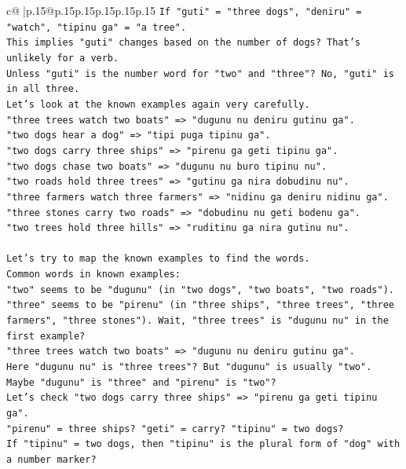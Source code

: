 \documentclass{article}
\begin{document}
{\begin{supertabular}{c@{$\;$}|p{.15\linewidth}@{}p{.15\linewidth}p{.15\linewidth}p{.15\linewidth}p{.15\linewidth}p{.15\linewidth}}
{{{\texttt{If "guti" = "three dogs", "deniru" = "watch", "tipinu ga" = "a tree".} \\
\texttt{This implies "guti" changes based on the number of dogs? That's unlikely for a verb.} \\
\texttt{Unless "guti" is the number word for "two" and "three"? No, "guti" is in all three.} \\
\texttt{Let's look at the known examples again very carefully.} \\
\texttt{"three trees watch two boats" => "dugunu nu deniru gutinu ga".} \\
\texttt{"two dogs hear a dog" => "tipi puga tipinu ga".} \\
\texttt{"two dogs carry three ships" => "pirenu ga geti tipinu ga".} \\
\texttt{"two dogs chase two boats" => "dugunu nu buro tipinu nu".} \\
\texttt{"two roads hold three trees" => "gutinu ga nira dobudinu nu".} \\
\texttt{"three farmers watch three farmers" => "nidinu ga deniru nidinu ga".} \\
\texttt{"three stones carry two roads" => "dobudinu nu geti bodenu ga".} \\
\texttt{"two trees hold three hills" => "ruditinu ga nira gutinu nu".} \\
\\ 
\texttt{Let's try to map the known examples to find the words.} \\
\texttt{Common words in known examples:} \\
\texttt{"two" seems to be "dugunu" (in "two dogs", "two boats", "two roads").} \\
\texttt{"three" seems to be "pirenu" (in "three ships", "three trees", "three farmers", "three stones"). Wait, "three trees" is "dugunu nu" in the first example?} \\
\texttt{"three trees watch two boats" => "dugunu nu deniru gutinu ga".} \\
\texttt{Here "dugunu nu" is "three trees"? But "dugunu" is usually "two".} \\
\texttt{Maybe "dugunu" is "three" and "pirenu" is "two"?} \\
\texttt{Let's check "two dogs carry three ships" => "pirenu ga geti tipinu ga".} \\
\texttt{"pirenu" = three ships? "geti" = carry? "tipinu" = two dogs?} \\
\texttt{If "tipinu" = two dogs, then "tipinu" is the plural form of "dog" with a number marker?} \\
}}}
\end{supertabular}}
\end{document}
